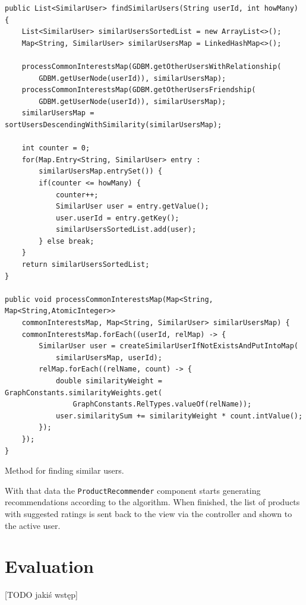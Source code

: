 \documentclass[12pt]{report}
\begin{document}
\begin{listing}[!h]
\begin{verbatim}
public List<SimilarUser> findSimilarUsers(String userId, int howMany) {
    List<SimilarUser> similarUsersSortedList = new ArrayList<>();
    Map<String, SimilarUser> similarUsersMap = LinkedHashMap<>();

    processCommonInterestsMap(GDBM.getOtherUsersWithRelationship(
        GDBM.getUserNode(userId)), similarUsersMap);
    processCommonInterestsMap(GDBM.getOtherUsersFriendship(
        GDBM.getUserNode(userId)), similarUsersMap);
    similarUsersMap = sortUsersDescendingWithSimilarity(similarUsersMap);

    int counter = 0;
    for(Map.Entry<String, SimilarUser> entry : 
        similarUsersMap.entrySet()) {
        if(counter <= howMany) {
            counter++;
            SimilarUser user = entry.getValue();
            user.userId = entry.getKey();
            similarUsersSortedList.add(user);
        } else break;
    }
    return similarUsersSortedList;
}

public void processCommonInterestsMap(Map<String, Map<String,AtomicInteger>>
    commonInterestsMap, Map<String, SimilarUser> similarUsersMap) {
    commonInterestsMap.forEach((userId, relMap) -> {
        SimilarUser user = createSimilarUserIfNotExistsAndPutIntoMap(
            similarUsersMap, userId);
        relMap.forEach((relName, count) -> {
            double similarityWeight = GraphConstants.similarityWeights.get(
                GraphConstants.RelTypes.valueOf(relName));
            user.similaritySum += similarityWeight * count.intValue();
        });
    });
}
\end{verbatim}
\caption{Method for finding similar users.}
\label{listing.find_similar_users}
\end{listing}

With that data the \texttt{ProductRecommender} component starts generating recommendations according to the algorithm. When finished, the list of products with suggested ratings is sent back to the view via the controller and shown to the active user.

%


\chapter{Evaluation}\label{ch.evaluation} 

[TODO jakiś wstęp]
\end{document}
